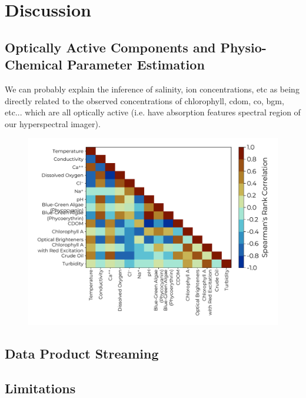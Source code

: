 \documentclass[journal,article,submit,pdftex,moreauthors]{Definitions/mdpi}
\begin{document}
\section{Discussion} \label{sec:discussion}


\subsection{Optically Active Components and Physio-Chemical Parameter Estimation}

We can probably explain the inference of salinity, ion concentrations, etc as being directly related to the observed concentrations of chlorophyll, cdom, co, bgm, etc... which are all optically active (i.e. have absorption features spectral region of our hyperspectral imager).

\begin{figure}[H]
\includegraphics[width=10.5 cm]{paper/figures/results/target_correlations.pdf}
\caption{\label{fig:target-correlations}}
\end{figure}   



\subsection{Data Product Streaming}

\subsection{Limitations}
\end{document}
